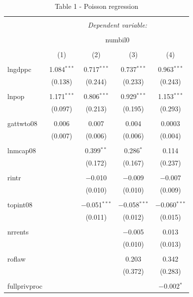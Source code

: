 \documentclass[]{book}
\begin{document}
\begin{table}[!htbp] \centering 
  \caption{Table 1 - Poisson regression} 
  \label{tab:} 
\begin{tabular}{@{\extracolsep{5pt}}lcccc} 
\\[-1.8ex]\hline 
\hline \\[-1.8ex] 
 & \multicolumn{4}{c}{\textit{Dependent variable:}} \\ 
\cline{2-5} 
\\[-1.8ex] & \multicolumn{4}{c}{numbil0} \\ 
\\[-1.8ex] & (1) & (2) & (3) & (4)\\ 
\hline \\[-1.8ex] 
 lngdppc & 1.084$^{***}$ & 0.717$^{***}$ & 0.737$^{***}$ & 0.963$^{***}$ \\ 
  & (0.138) & (0.244) & (0.233) & (0.243) \\ 
  & & & & \\ 
 lnpop & 1.171$^{***}$ & 0.806$^{***}$ & 0.929$^{***}$ & 1.153$^{***}$ \\ 
  & (0.097) & (0.213) & (0.195) & (0.293) \\ 
  & & & & \\ 
 gattwto08 & 0.006 & 0.007 & 0.004 & 0.0003 \\ 
  & (0.007) & (0.006) & (0.006) & (0.004) \\ 
  & & & & \\ 
 lnmcap08 &  & 0.399$^{**}$ & 0.286$^{*}$ & 0.114 \\ 
  &  & (0.172) & (0.167) & (0.237) \\ 
  & & & & \\ 
 rintr &  & $-$0.010 & $-$0.009 & $-$0.007 \\ 
  &  & (0.010) & (0.010) & (0.009) \\ 
  & & & & \\ 
 topint08 &  & $-$0.051$^{***}$ & $-$0.058$^{***}$ & $-$0.060$^{***}$ \\ 
  &  & (0.011) & (0.012) & (0.015) \\ 
  & & & & \\ 
 nrrents &  &  & $-$0.005 & 0.013 \\ 
  &  &  & (0.010) & (0.013) \\ 
  & & & & \\ 
 roflaw &  &  & 0.203 & 0.342 \\ 
  &  &  & (0.372) & (0.283) \\ 
  & & & & \\ 
 fullprivproc &  &  &  & $-$0.002$^{*}$ \\ 

\end{tabular}
\end{table}
\end{document}
